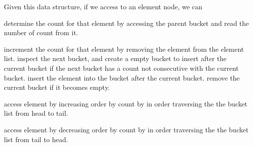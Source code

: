 \documentclass[12pt]{article}
\begin{document}
\begin{enumerate}
Given this data structure, if we access to an element node, we can

determine the count for that element by accessing the parent bucket and read the number of count from it.

increment the count for that element by removing the element from the element list. inspect the next bucket, and create a empty bucket to insert after the current bucket if the next bucket has a count not consecutive with the current bucket. insert the element into the bucket after the current bucket. remove the current bucket if it becomes empty.

access element by increasing order by count by in order traversing the the bucket list from head to tail.

access element by decreasing order by count by in order traversing the the bucket list from tail to head.

\end{enumerate}
\end{document}
